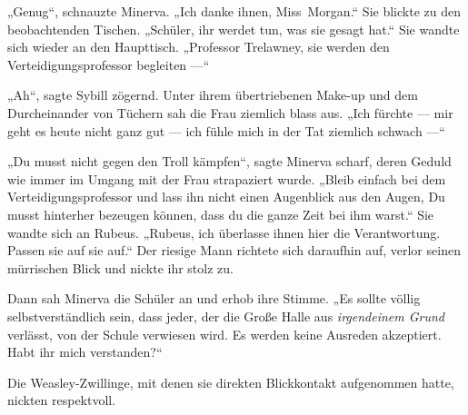 „Genug“, schnauzte Minerva.
„Ich danke ihnen, Miss~Morgan.“ Sie blickte zu den beobachtenden Tischen.
„Schüler, ihr werdet tun, was sie gesagt hat.“ Sie wandte sich wieder an den Haupttisch.
„Professor Trelawney, sie werden den Verteidigungsprofessor begleiten —“

„Ah“, sagte Sybill zögernd. Unter ihrem übertriebenen Make-up und dem Durcheinander von Tüchern sah die Frau ziemlich blass aus.
„Ich fürchte — mir geht es heute nicht ganz gut — ich fühle mich in der Tat ziemlich schwach —“

„Du musst nicht gegen den Troll kämpfen“, sagte Minerva scharf, deren Geduld wie immer im Umgang mit der Frau strapaziert wurde.
„Bleib einfach bei dem Verteidigungsprofessor und lass ihn nicht einen Augenblick aus den Augen, Du musst hinterher bezeugen können, dass du die ganze Zeit bei ihm warst.“ Sie wandte sich an Rubeus.
„Rubeus, ich überlasse ihnen hier die Verantwortung. Passen sie auf sie auf.“
Der riesige Mann richtete sich daraufhin auf, verlor seinen mürrischen Blick und nickte ihr stolz zu.

Dann sah Minerva die Schüler an und erhob ihre Stimme.
„Es sollte völlig selbstverständlich sein, dass jeder, der die Große Halle aus \emph{irgendeinem Grund} verlässt, von der Schule verwiesen wird. Es werden keine Ausreden akzeptiert. Habt ihr mich verstanden?“

Die Weasley-Zwillinge, mit denen sie direkten Blickkontakt aufgenommen hatte, nickten respektvoll.

